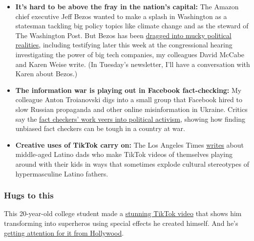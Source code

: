 \begin{itemize}
\item
  \textbf{It's hard to be above the fray in the nation's capital:} The
  Amazon chief executive Jeff Bezos wanted to make a splash in
  Washington as a statesman tackling big policy topics like climate
  change and as the steward of The Washington Post. But Bezos has been
  \href{https://www.nytimes3xbfgragh.onion/2020/07/27/business/jeff-bezos-amazon-congress.html}{dragged
  into mucky political realities}, including testifying later this week
  at the congressional hearing investigating the power of big tech
  companies, my colleagues David McCabe and Karen Weise write. (In
  Tuesday's newsletter, I'll have a conversation with Karen about
  Bezos.)
\item
  \textbf{The information war is playing out in Facebook fact-checking:}
  My colleague Anton Troianovski digs into a small group that Facebook
  hired to slow Russian propaganda and other online misinformation in
  Ukraine. Critics say the
  \href{https://www.nytimes3xbfgragh.onion/2020/07/26/world/europe/ukraine-facebook-fake-news.html}{fact
  checkers' work veers into political activism}, showing how finding
  unbiased fact checkers can be tough in a country at war.
\item
  \textbf{Creative uses of TikTok carry on:} The Los Angeles Times
  \href{https://www.latimes.com/california/story/2020-07-26/papas-on-el-tiktok-how-latino-dads-are-using-the-app-to-connect-with-their-children?_amp=true\&__twitter_impression=true\&s=09}{writes}
  about middle-aged Latino dads who make TikTok videos of themselves
  playing around with their kids in ways that sometimes explode cultural
  stereotypes of hypermasculine Latino fathers.
\end{itemize}

\hypertarget{hugs-to-this}{%
\subsubsection{Hugs to this}\label{hugs-to-this}}

This 20-year-old college student made a
\href{https://www.tiktok.com/@thejulianbass/video/6844906456471457030?lang=en}{stunning
TikTok video} that shows him transforming into superheros using special
effects he created himself. And he's
\href{https://www.kqed.org/arts/13882973/a-student-gets-supersized-attention-after-superhero-video-goes-viral?utm_medium=Email\&utm_source=ExactTarget\&utm_campaign=summerlearning20\&mc_key=003i000001Xhtw9AAB}{getting
attention for it from Hollywood}.


